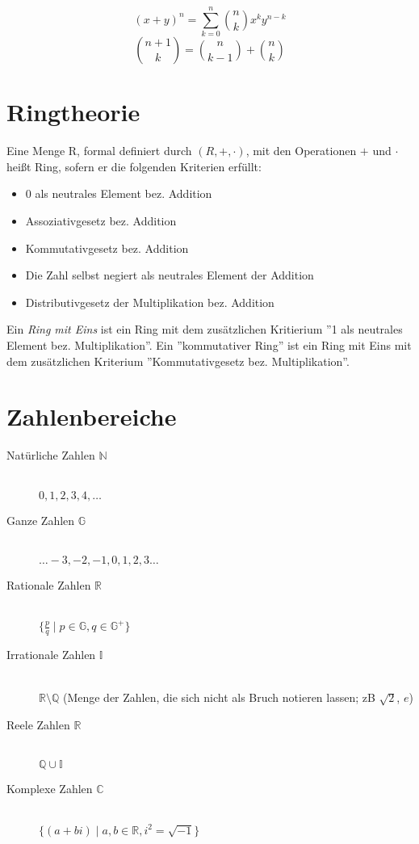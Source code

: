 \documentclass[11pt,a4paper,twocolumn]{article}
\newcommand{\set}[1]{{\Big\{}#1{\Big\}}}
\theoremstyle{area}
\begin{document}
\begin{equation}
    (x + y)^n = \sum_{k=0}^n \binom{n}{k} x^k y^{n-k}
\end{equation}
\[
    \binom{n+1}{k} = \binom{n}{k-1} + \binom{n}{k}
\]

\section{Ringtheorie}

Eine Menge R, formal definiert durch $(R, +, \cdot)$, mit den Operationen
$+$ und $\cdot$ heißt Ring, sofern er die folgenden Kriterien erfüllt:

\begin{itemize}
  \item 0 als neutrales Element bez. Addition
  \item Assoziativgesetz bez. Addition
  \item Kommutativgesetz bez. Addition
  \item Die Zahl selbst negiert als neutrales Element der Addition
  \item Distributivgesetz der Multiplikation bez. Addition
\end{itemize}

Ein \emph{Ring mit Eins} ist ein Ring mit dem zusätzlichen Kritierium
''1 als neutrales Element bez. Multiplikation''. Ein ''kommutativer
Ring'' ist ein Ring mit Eins mit dem zusätzlichen Kriterium
''Kommutativgesetz bez. Multiplikation''.

\section{Zahlenbereiche}

\begin{description}
  \item[Natürliche Zahlen $\mathbb{N}$] \hfill \\
    $0, 1, 2, 3, 4, \dots$
  \item[Ganze Zahlen $\mathbb{G}$] \hfill \\
    $\dots -3, -2, -1, 0, 1, 2, 3 \dots$
  \item[Rationale Zahlen $\mathbb{R}$] \hfill \\
    $\set{\frac{p}{q} \mid p \in \mathbb{G}, q \in \mathbb{G}^+} $
  \item[Irrationale Zahlen $\mathbb{I}$] \hfill \\
    $\mathbb{R} \setminus \mathbb{Q}$ (Menge der Zahlen, die sich nicht
    als Bruch notieren lassen; zB $\sqrt{2}$, $e$)
  \item[Reele Zahlen $\mathbb{R}$] \hfill \\
    $\mathbb{Q} \cup \mathbb{I}$
  \item[Komplexe Zahlen $\mathbb{C}$] \hfill \\
    $\set{(a + bi) \mid a, b \in \mathbb{R}, i^2 = \sqrt{-1}}$
\end{description}
\end{document}
